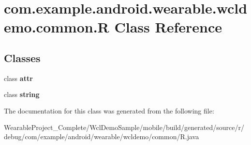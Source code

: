 \hypertarget{classcom_1_1example_1_1android_1_1wearable_1_1wcldemo_1_1common_1_1R}{}\section{com.\+example.\+android.\+wearable.\+wcldemo.\+common.\+R Class Reference}
\label{classcom_1_1example_1_1android_1_1wearable_1_1wcldemo_1_1common_1_1R}
\subsection*{Classes}
\begin{DoxyCompactItemize}
\item 
class {\bfseries attr}
\item 
class {\bfseries string}
\end{DoxyCompactItemize}


The documentation for this class was generated from the following file\+:\begin{DoxyCompactItemize}
\item 
Wearable\+Project\+\_\+\+Complete/\+Wcl\+Demo\+Sample/mobile/build/generated/source/r/debug/com/example/android/wearable/wcldemo/common/R.\+java\end{DoxyCompactItemize}
